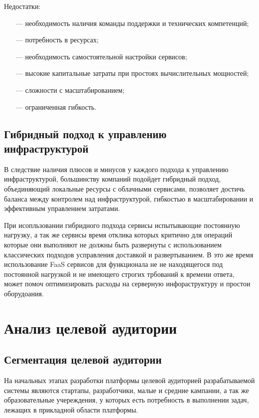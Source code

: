 Недостатки:
\begin{itemize}
    \item[---]необходимость наличия команды поддержки и технических компетенций;
    \item[---]потребность в ресурсах;
    \item[---]необходимость самостоятельной настройки сервисов;
    \item[---]высокие капитальные затраты при простоях вычислительных мощностей;
    \item[---]сложности с масштабированием;
    \item[---]ограниченная гибкость.
\end{itemize}

\subsection{Гибридный подход к управлению инфраструктурой}

В следствие наличия плюсов и минусов у каждого подхода к управлению инфраструктурой, большинству компаний подойдет гибридный подход, объединяющий локальные ресурсы с облачными сервисами, позволяет достичь баланса между контролем над инфраструктурой, гибкостью в масштабировании и эффективным управлением затратами.

При исопльзовании гибридного подхода сервисы испытывающие постоянную нагрузку, а так же сервисы время отклика которых критично для операций которые они выполняют не должны быть развернуты с использованием классических подходов усправления доставкой и развертыванием.
В это же время использование FaaS сервисов для функционала не не находящегося под постоянной нагрузкой и не имеющего строгих трбований к времени ответа, может помоч оптимизировать расходы на серверную инфораструктуру и простои оборудоания.

\section{Анализ целевой аудитории}

\subsection{Сегментация целевой аудитории}

На начальных этапах разработки платформы целевой аудиторией разрабатываемой системы являются стартапы, разработчики, малые и средние кампании, а так же образовательные учереждения, у которых есть потребность в выполнении задач, лежащих в прикладной области платформы.

